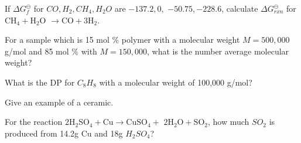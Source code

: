 \documentclass[answers]{exam}
\begin{document}
\begin{multicols}{2}
\begin{questions}

\question If $\Delta G_f^\ominus$ for $CO, H_2, CH_4, H_2O$ are $-137.2, 0,$ $-50.75, -228.6$, calculate $\Delta G_{rxn}^\ominus$ for $\mathrm{CH_4 + H_2O}$ $\mathrm{\to CO + 3H_2}$.
\answerline[142.2 kJ]

\question For a sample which is 15 mol \% polymer with a molecular weight $M = 500,000$ g/mol and 85 mol \% with $M = 150,000$, what is the number average molecular weight?
\answerline[202,500]

\question What is the DP for $C_8H_8$ with a molecular weight of 100,000 g/mol?
\answerline[960]

\question Give an example of a ceramic.
\answerline[CSi]

\question For the reaction $\mathrm{2H_2SO_4 + Cu \to CuSO_4 +}$ $\mathrm{2H_2O + SO_2}$, how much $SO_2$ is produced from 14.2g Cu and 18g $H_2SO_4$?
\answerline[5.88g]

\end{questions}
\end{multicols}


\newpage
\end{document}
